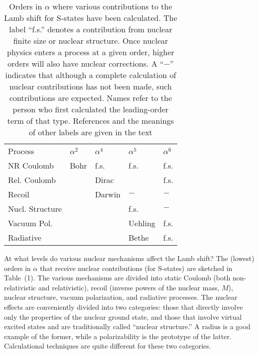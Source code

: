 \documentclass{svmult}
\begin{document}
\begin{table}[ht]
\centering
\caption{Orders in $\alpha$ where various contributions to the Lamb shift for
S-states have been calculated. The label ``f.s.'' denotes a contribution from
nuclear finite size or nuclear structure. Once nuclear physics enters a
process at a given order, higher orders will also have nuclear corrections. A
``$\mbox{$-$}$'' indicates that although a  complete calculation of nuclear
contributions has not been made, such contributions are expected. Names refer
to the person who first calculated the leading-order term of that type.
References and the meanings of other labels are given in the text}
\begin{tabular}{l l l l l}
\hline \noalign{\smallskip}
Process \hspace{0.5in} & $\alpha^2$ & $\alpha^4$ & $\alpha^5$ & $\alpha^6$ \\ 
\noalign{\smallskip}
\hline
NR Coulomb & Bohr \hspace{0.2in}& f.s.    & f.s.      & f.s.     \\ \hline
Rel. Coulomb    & & Dirac     &           & f.s.     \\ \hline
Recoil          & & Darwin \hspace{0.02in}&\mbox{$-$} &\mbox{$-$}\\ \hline
Nucl. Structure & &           & f.s.      &\mbox{$-$}\rule{0in}{2.5ex}\\ \hline 
Vacuum Pol.     & &           & Uehling \hspace{0.2in}& f.s.     \\ \hline
Radiative       & &           & Bethe     & f.s.     \\ \hline
\end{tabular}
\end{table}

At what levels do various nuclear mechanisms affect the Lamb
shift? The (lowest) orders in $\alpha$
that receive nuclear contributions (for S-states) are sketched in Table~(1).
The various mechanisms are divided into static Coulomb (both non-relativistic
and relativistic), recoil (inverse powers of the nuclear mass, $M$), nuclear
structure, vacuum polarization, and radiative processes. The nuclear effects are
conveniently divided into two categories: those that directly involve only the
properties of the nuclear ground state, and those that involve virtual excited
states and are traditionally called ``nuclear structure.'' A radius is a good
example of the former, while a polarizability is the prototype of the latter.
Calculational techniques are quite different for these two categories.
\end{document}
